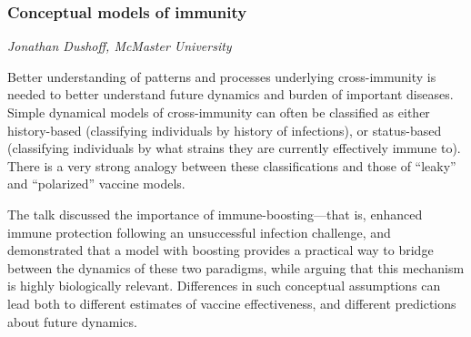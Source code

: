 \subsubsection*{Conceptual models of immunity}
\textit{Jonathan Dushoff, McMaster University}

Better understanding of patterns and processes underlying
cross-immunity is needed to better understand future dynamics and
burden of important diseases. Simple dynamical models of
cross-immunity can often be classified as either history-based
(classifying individuals by history of infections), or status-based
(classifying individuals by what strains they are currently
effectively immune to). There is a very strong analogy between these
classifications and those of “leaky” and “polarized” vaccine models.

The talk discussed the importance of immune-boosting---that is,
enhanced immune protection following an unsuccessful infection
challenge, and demonstrated that a model with boosting provides a
practical way to bridge between the dynamics of these two paradigms,
while arguing that this mechanism is highly biologically relevant.
Differences in such conceptual assumptions can lead both to different
estimates of vaccine effectiveness, and different predictions about
future dynamics.
